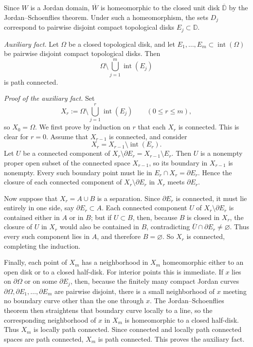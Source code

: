 \documentclass[12pt]{amsart}
\theoremstyle{definition}
\theoremstyle{remark}
\begin{document}
Since $W$ is a Jordan domain, $\overline W$ is homeomorphic to the closed unit disk
$\overline{\mathbb D}$ by the Jordan--Schoenflies theorem. Under such a homeomorphism,
the sets $D_j$ correspond to pairwise disjoint compact topological disks
$E_j\subset \mathbb D$.

\medskip
\noindent\emph{Auxiliary fact.}
Let $\Omega$ be a closed topological disk, and let
$E_1,\dots,E_m\subset \operatorname{int}(\Omega)$ be pairwise disjoint compact
topological disks. Then
\[
\Omega\setminus \bigcup_{j=1}^m \operatorname{int}(E_j)
\]
is path connected.

\smallskip
\noindent\emph{Proof of the auxiliary fact.}
Set
\[
X_r:=\Omega\setminus \bigcup_{j=1}^r \operatorname{int}(E_j)
\qquad (0\le r\le m),
\]
so $X_0=\Omega$. We first prove by induction on $r$ that each $X_r$ is connected.
This is clear for $r=0$. Assume that $X_{r-1}$ is connected, and consider
\[
X_r=X_{r-1}\setminus \operatorname{int}(E_r).
\]
Let $U$ be a connected component of $X_r\setminus \partial E_r=X_{r-1}\setminus E_r$.
Then $U$ is a nonempty proper open subset of the connected space $X_{r-1}$, so its
boundary in $X_{r-1}$ is nonempty. Every such boundary point must lie in $E_r\cap X_r=\partial E_r$.
Hence the closure of each connected component of $X_r\setminus \partial E_r$ in $X_r$
meets $\partial E_r$.

Now suppose that $X_r=A\cup B$ is a separation. Since $\partial E_r$ is connected, it must lie
entirely in one side, say $\partial E_r\subset A$. Each connected component $U$ of
$X_r\setminus \partial E_r$ is contained either in $A$ or in $B$; but if $U\subset B$, then,
because $B$ is closed in $X_r$, the closure of $U$ in $X_r$ would also be contained in $B$,
contradicting $\overline U\cap \partial E_r\neq\varnothing$. Thus every such component lies in $A$,
and therefore $B=\varnothing$. So $X_r$ is connected, completing the induction.

Finally, each point of $X_m$ has a neighborhood in $X_m$ homeomorphic either to an open disk
or to a closed half-disk. For interior points this is immediate. If $x$ lies on $\partial\Omega$
or on some $\partial E_j$, then, because the finitely many compact Jordan curves
$\partial\Omega,\partial E_1,\dots,\partial E_m$ are pairwise disjoint, there is a small neighborhood
of $x$ meeting no boundary curve other than the one through $x$. The Jordan--Schoenflies theorem
then straightens that boundary curve locally to a line, so the corresponding neighborhood of $x$ in
$X_m$ is homeomorphic to a closed half-disk. Thus $X_m$ is locally path connected. Since connected
and locally path connected spaces are path connected, $X_m$ is path connected. This proves the auxiliary fact.
\medskip
\end{document}

